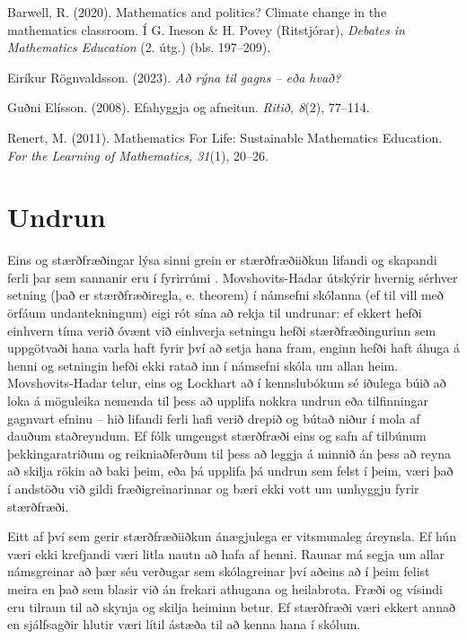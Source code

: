 \documentclass[
  icelandic,
]{book}
\begin{document}
Barwell, R. (2020). Mathematics and politics? Climate change in the mathematics classroom. Í G. Ineson \& H. Povey (Ritstjórar), \emph{Debates in Mathematics Education} (2. útg.) (bls. 197--209).

Eiríkur Rögnvaldsson. (2023). \emph{Að rýna til gagns -- eða hvað?}

Guðni Elísson. (2008). Efahyggja og afneitun. \emph{Ritið, 8}(2), 77--114.

Renert, M. (2011). Mathematics For Life: Sustainable Mathematics Education. \emph{For the Learning of Mathematics, 31}(1), 20--26.

\chapter{Undrun}\label{undrun}

Eins og stærðfræðingar lýsa sinni grein er stærðfræðiiðkun lifandi og skapandi ferli þar sem sannanir eru í fyrirrúmi \autocite{polya1990,su2020}. Movshovits-Hadar \autocite{movshovits-hadar1988} útskýrir hvernig sérhver setning (það er stærðfræðiregla, e. theorem) í námsefni skólanna (ef til vill með örfáum undantekningum) eigi rót sína að rekja til undrunar: ef ekkert hefði einhvern tíma verið óvænt við einhverja setningu hefði stærðfræðingurinn sem uppgötvaði hana varla haft fyrir því að setja hana fram, enginn hefði haft áhuga á henni og setningin hefði ekki ratað inn í námsefni skóla um allan heim. Movshovits-Hadar \autocite{movshovits-hadar1988} telur, eins og Lockhart að í kennslubókum sé iðulega búið að loka á möguleika nemenda til þess að upplifa nokkra undrun eða tilfinningar gagnvart efninu -- hið lifandi ferli hafi verið drepið og bútað niður í mola af dauðum staðreyndum. Ef fólk umgengst stærðfræði eins og safn af tilbúnum þekkingaratriðum og reikniaðferðum til þess að leggja á minnið án þess að reyna að skilja rökin að baki þeim, eða þá upplifa þá undrun sem felst í þeim, væri það í andstöðu við gildi fræðigreinarinnar og bæri ekki vott um umhyggju fyrir stærðfræði.

Eitt af því sem gerir stærðfræðiiðkun ánægjulega er vitsmunaleg áreynsla. Ef hún væri ekki krefjandi væri litla nautn að hafa af henni. Raunar má segja um allar námsgreinar að þær séu verðugar sem skólagreinar því aðeins að í þeim felist meira en það sem blasir við án frekari athugana og heilabrota. Fræði og vísindi eru tilraun til að skynja og skilja heiminn betur. Ef stærðfræði væri ekkert annað en sjálfsagðir hlutir væri lítil ástæða til að kenna hana í skólum.
\end{document}
